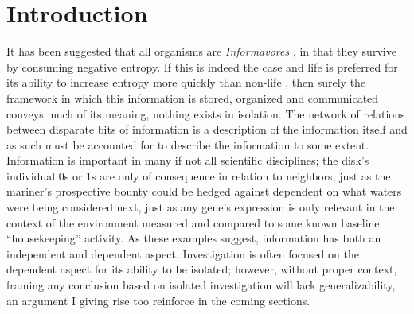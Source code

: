 

\graphicspath{{1_introduction/figures/}} %





\setcounter{page}{1}
\chapter{Introduction}
\label{sec:intro}
It has been suggested that all organisms are \emph{Informavores} \citep{MARGALEF1996141}, in that they survive by consuming negative entropy. If this is indeed the case and life is preferred for its ability to increase entropy more quickly than non-life \citep{england2013statistical}, then surely the framework in which this information is stored, organized and communicated conveys much of its meaning, \ie nothing exists in isolation. The network of relations between disparate bits of information is a description of the information itself and as such must be accounted for to describe the information to some extent. Information is important in many if not all scientific disciplines; the disk's individual 0s or 1s are only of consequence in relation to neighbors, just as the mariner's prospective bounty could be hedged against dependent on what waters were being considered next, just as any gene's expression is only relevant in the context of the environment measured and compared to some known baseline \eg ``housekeeping'' activity. As these examples suggest, information has both an independent and dependent aspect. Investigation is often focused on the dependent aspect for its ability to be isolated; however, without proper context, framing any conclusion based on isolated investigation will lack generalizability, an argument I giving rise too reinforce in the coming sections.

